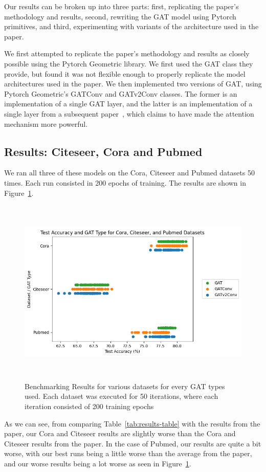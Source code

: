 Our results can be broken up into three parts: first, replicating the paper's
methodology and results, second, rewriting the GAT model using Pytorch
primitives, and third, experimenting with variants of the architecture used in
the paper.

We first attempted to replicate the paper's methodology and results as closely
possible using the Pytorch Geometric library. We first used the GAT class they
provide, but found it was not flexible enough to properly replicate the model
architectures used in the paper. We then implemented two versions of GAT, using
Pytorch Geometric's GATConv and GATv2Conv classes. The former is an
implementation of a single GAT layer, and the latter is an implementation of
a single layer from a subsequent paper~\cite{velivckovic2021attentive},
which claims to have made the attention mechanism more powerful.

\subsection{Results: Citeseer, Cora and Pubmed}\label{subsec:results:-citeseer-cora-and-pubmed}
We ran all three of these models on the Cora, Citeseer and Pubmed datasets 50
times. Each run consisted in 200 epochs of training. The results are shown in Figure~\ref{fig:benchmarks}.

\begin{figure}
    \includegraphics[width=\textwidth, height=9cm]{images/Benchmarking_Result_Graph}
    \caption{Benchmarking Results for various datasets for every GAT types used. Each dataset was executed for 50
    iterations, where each iteration consisted of 200 training epochs}
    \label{fig:benchmarks}
\end{figure}
As we can see, from comparing Table~\ref{tab:results-table} with the results from the paper,
our Cora and Citeseer results are slightly worse than the Cora and Citeseer results from the paper.
In the case of Pubmed, our results are quite a bit worse, with our best runs being
a little worse than the average from the paper, and our worse results being
a lot worse as seen in Figure~\ref{fig:benchmarks}.

